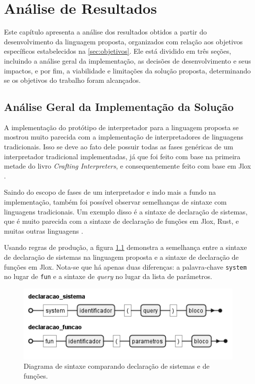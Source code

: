 \chapter{Análise de Resultados} \label{ch:analise_resultados}

Este capítulo apresenta a análise dos resultados obtidos a partir do desenvolvimento da linguagem proposta, organizados com relação aos objetivos específicos estabelecidos na \autoref{sec:objetivos}. Ele está dividido em três seções, incluindo a análise geral da implementação, as decisões de desenvolvimento e seus impactos, e por fim, a viabilidade e limitações da solução proposta, determinando se os objetivos do trabalho foram alcançados.

\section{Análise Geral da Implementação da Solução}

A implementação do protótipo de interpretador para a linguagem proposta se mostrou muito parecida com a implementação de interpretadores de linguagens tradicionais. Isso se deve ao fato dele possuir todas as fases genéricas de um interpretador tradicional implementadas, já que foi feito com base na primeira metade do livro \textit{Crafting Interpreters}, e consequentemente feito com base em Jlox \cite{craftinginterpreters}.

Saindo do escopo de fases de um interpretador e indo mais a fundo na implementação, também foi possível observar semelhanças de sintaxe com linguagens tradicionais. Um exemplo disso é a sintaxe de declaração de sistemas, que é muito parecida com a sintaxe de declaração de funções em Jlox, Rust, e muitas outras linguagens \cite{rustbook,craftinginterpreters}.

Usando regras de produção, a figura \ref{fig:decl_sistema_funcao} demonstra a semelhança entre a sintaxe de declaração de sistemas na linguagem proposta e a sintaxe de declaração de funções em Jlox. Nota-se que há apenas duas diferenças: a palavra-chave \texttt{system} no lugar de \texttt{fun} e a sintaxe de \textit{query} no lugar da lista de parâmetros.

\begin{figure}[H]
	\centering
	\includegraphics[width=0.45\textheight]{../diagrams/decl_sistema_funcao.png}
	\caption{Diagrama de sintaxe comparando declaração de sistemas e de funções.}
	\label{fig:decl_sistema_funcao}
\end{figure}

